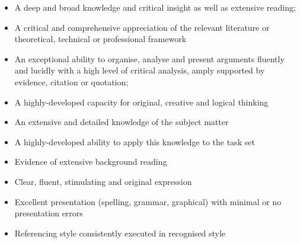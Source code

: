 \documentclass[12pt,a4paper]{article}
\begin{document}
\begin{itemize}
	\item A deep and broad knowledge and critical insight as well as extensive reading;
	\item A critical and comprehensive appreciation
	of the relevant literature or theoretical, technical or professional framework
	\item An exceptional ability to organise, analyse and present arguments fluently and lucidly with a high level of critical analysis, amply supported by evidence, citation or quotation;
	\item A highly-developed capacity for original,
	creative and logical thinking
	\item An extensive and detailed knowledge of the subject matter
	\item A highly-developed ability to apply this knowledge to the task set
	\item Evidence of extensive background reading
	\item Clear, fluent, stimulating and original expression
	\item Excellent presentation (spelling, grammar, graphical) with minimal or no presentation errors
	\item Referencing style consistently executed in recognised style
\end{itemize}



\end{document}
